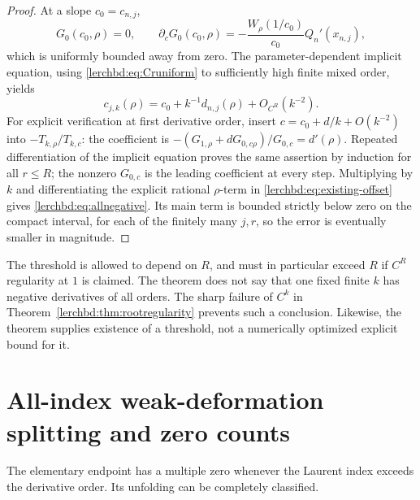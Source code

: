 \begin{proof}
At a slope $c_0=c_{n,j}$,
\[
 G_0(c_0,\rho)=0,\qquad
 \partial_cG_0(c_0,\rho)
 =-\frac{W_\rho(1/c_0)}{c_0}Q_n'(x_{n,j}),
\]
which is uniformly bounded away from zero. The parameter-dependent implicit equation, using \eqref{lerchbd:eq:Cruniform} to sufficiently high finite mixed order, yields
\[
 c_{j,k}(\rho)=c_0+k^{-1}d_{n,j}(\rho)+O_{C^R}(k^{-2}).
\]
For explicit verification at first derivative order, insert $c=c_0+d/k+O(k^{-2})$ into $-T_{k,\rho}/T_{k,c}$: the coefficient is
$-(G_{1,\rho}+dG_{0,c\rho})/G_{0,c}=d'(\rho)$. Repeated differentiation of the implicit equation proves the same assertion by induction for all $r\le R$; the nonzero $G_{0,c}$ is the leading coefficient at every step. Multiplying by $k$ and differentiating the explicit rational $\rho$-term in \eqref{lerchbd:eq:existing-offset} gives \eqref{lerchbd:eq:allnegative}. Its main term is bounded strictly below zero on the compact interval, for each of the finitely many $j,r$, so the error is eventually smaller in magnitude.
\end{proof}

\begin{remark}
The threshold is allowed to depend on $R$, and must in particular exceed $R$ if $C^R$ regularity at $1$ is claimed. The theorem does not say that one fixed finite $k$ has negative derivatives of all orders. The sharp failure of $C^k$ in Theorem~\ref{lerchbd:thm:rootregularity} prevents such a conclusion. Likewise, the theorem supplies existence of a threshold, not a numerically optimized explicit bound for it.
\end{remark}

\section{All-index weak-deformation splitting and zero counts}\label{lerchbd:sec:weak}
The elementary endpoint has a multiple zero whenever the Laurent index exceeds the derivative order. Its unfolding can be completely classified.

